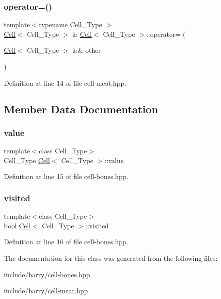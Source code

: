 \subsubsection{\texorpdfstring{operator=()}{operator=()}\hspace{0.1cm}{\footnotesize\ttfamily [2/2]}}
{\footnotesize\ttfamily template$<$typename Cell\+\_\+\+Type $>$ \\
\hyperlink{class_cell}{Cell}$<$ Cell\+\_\+\+Type $>$ \& \hyperlink{class_cell}{Cell}$<$ Cell\+\_\+\+Type $>$\+::operator= (\begin{DoxyParamCaption}\item[{\hyperlink{class_cell}{Cell}$<$ Cell\+\_\+\+Type $>$ \&\&}]{other }\end{DoxyParamCaption})\hspace{0.3cm}{\ttfamily [noexcept]}}



Definition at line 14 of file cell-\/meat.\+hpp.



\subsection{Member Data Documentation}
\mbox{\label{class_cell_a5df1609bc0705830ec4dc6e177ddc955}} 
\subsubsection{\texorpdfstring{value}{value}}
{\footnotesize\ttfamily template$<$class Cell\+\_\+\+Type$>$ \\
Cell\+\_\+\+Type \hyperlink{class_cell}{Cell}$<$ Cell\+\_\+\+Type $>$\+::value}



Definition at line 15 of file cell-\/bones.\+hpp.

\mbox{\label{class_cell_a1f539a05953fa05d723c32e718f0eeb3}} 
\subsubsection{\texorpdfstring{visited}{visited}}
{\footnotesize\ttfamily template$<$class Cell\+\_\+\+Type$>$ \\
bool \hyperlink{class_cell}{Cell}$<$ Cell\+\_\+\+Type $>$\+::visited}



Definition at line 16 of file cell-\/bones.\+hpp.



The documentation for this class was generated from the following files\+:\begin{DoxyCompactItemize}
\item 
include/barry/\hyperlink{cell-bones_8hpp}{cell-\/bones.\+hpp}\item 
include/barry/\hyperlink{cell-meat_8hpp}{cell-\/meat.\+hpp}\end{DoxyCompactItemize}
